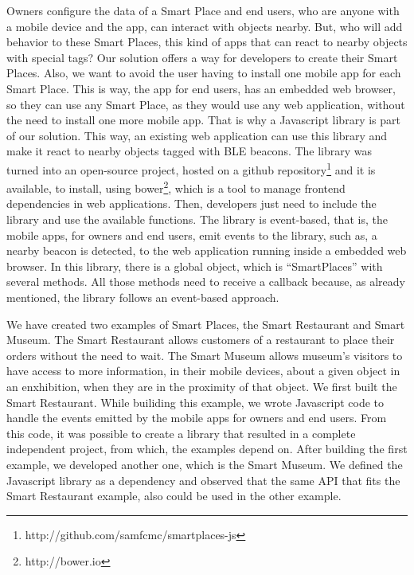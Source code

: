 Owners configure the data of a Smart Place and end users, who are anyone with a mobile device and the app, can interact with objects nearby.
But, who will add behavior to these Smart Places, this kind of apps that can react to nearby objects with special tags?
Our solution offers a way for developers to create their Smart Places.
Also, we want to avoid the user having to install one mobile app for each Smart Place.
This is way, the app for end users,
has an embedded web browser, so they can use any Smart Place, as they would use any web application, without the need to install one more mobile app.
That is why a Javascript library is part of our solution.
This way, an existing web application can use this library and make it react to nearby objects tagged with \gls{BLE} beacons.
The library was turned into an open-source project, hosted on a github repository\footnote{http://github.com/samfcmc/smartplaces-js} and it is available, to install, using bower\footnote{http://bower.io}, which is a tool to manage frontend dependencies in web applications.
Then, developers just need to include the library and use the available functions.
The library is event-based, that is, the mobile apps, for owners and end users, emit events to the library, such as, a nearby beacon is detected, to the web application running inside a embedded web browser.
In this library, there is a global object, which is ``SmartPlaces'' with several methods.
All those methods need to receive a callback because, as already mentioned, the library follows an event-based approach.

We have created two examples of Smart Places, the Smart Restaurant and Smart Museum.
The Smart Restaurant allows customers of a restaurant to place their orders without the need to wait.
The Smart Museum allows museum's visitors to have access to more information, in their mobile devices, about a given object in an enxhibition, when they are in the proximity of that object.
We first built the Smart Restaurant.
While builiding this example, we wrote Javascript code to handle the events emitted by the mobile apps for owners and end users.
From this code, it was possible to create a library that resulted in a complete independent project, from which, the examples depend on.
After building the first example, we developed another one, which is the Smart Museum.
We defined the Javascript library as a dependency and observed that the same \gls{API} that fits the Smart Restaurant example, also could be used in the other example.
